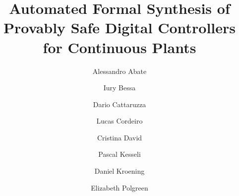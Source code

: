 \usepackage{url}

\newcommand{\addtodo}[1]{\textcolor{red}{[#1]}}
\newcommand{\mat}[1]{{#1}}
\renewcommand{\vec}[1]{{#1}}
\newcommand{\comment}[1]{}

\newcommand{\xmark}{\ding{55}}

\renewcommand{\note}[1]{\textcolor{red}{[#1]}}
\newcommand{\reply}[1]{\textcolor{blue}{[#1]}}


\newcommand\tool{{\sf DSSynth}}




\title{Automated Formal Synthesis 
of Provably Safe Digital Controllers 
for Continuous Plants}


\author{Alessandro Abate         \and
        Iury Bessa \and
        Dario Cattaruzza \and
        Lucas Cordeiro \and
        Cristina David \and
        Pascal Kesseli \and
        Daniel Kroening \and
        Elizabeth Polgreen
}


\institute{}



%


